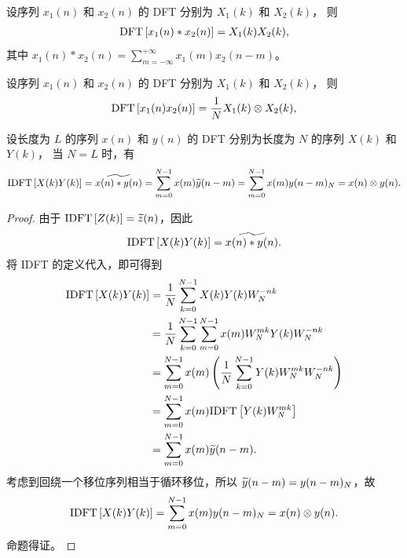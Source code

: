 \begin{property}
    设序列 $x_1(n)$ 和 $x_2(n)$ 的 DFT 分别为 $X_1(k)$ 和 $X_2(k)$，
    则
    \begin{align*}
        \mathrm{DFT}\left[x_1(n) * x_2(n)\right] = X_1(k)X_2(k),
    \end{align*}
    其中 $x_1(n) * x_2(n) = \sum_{m = -\infty}^{+\infty}x_1(m)x_2(n - m)$。
\end{property}

\begin{property}
    设序列 $x_1(n)$ 和 $x_2(n)$ 的 DFT 分别为 $X_1(k)$ 和 $X_2(k)$，
    则
    \begin{align*}
        \mathrm{DFT}\left[x_1(n)x_2(n)\right] = \frac{1}{N}X_1(k) \otimes X_2(k),
    \end{align*}
\end{property}

\begin{property}
    设长度为 $L$ 的序列 $x(n)$ 和 $y(n)$ 的 DFT 分别为长度为 $N$ 的序列 $X(k)$ 和 $Y(k)$，
    当 $N = L$ 时，有
    \begin{align*}
        \mathrm{IDFT}\left[X(k)Y(k)\right] = \widetilde{x(n) * y(n)}
        = \sum_{m = 0}^{N - 1}x(m)\widetilde{y}(n - m)
        = \sum_{m = 0}^{N - 1}x(m)y(n - m)_N = x(n) \otimes y(n).
    \end{align*}
\end{property}

\begin{proof}
    由于 $\mathrm{IDFT}\left[Z(k)\right] = \widetilde{z}(n)$，因此
    \begin{align*}
        \mathrm{IDFT}\left[X(k)Y(k)\right] = \widetilde{x(n) * y(n)}.
    \end{align*}
    将 IDFT 的定义代入，即可得到
    \begin{align*}
        \mathrm{IDFT}\left[X(k)Y(k)\right] & = \frac{1}{N}\sum_{k = 0}^{N - 1}X(k)Y(k)W_N^{-nk} \\
        & = \frac{1}{N}\sum_{k = 0}^{N - 1}\sum_{m = 0}^{N - 1}x(m)W_N^{mk}Y(k)W_N^{-nk} \\
        & = \sum_{m = 0}^{N - 1}x(m)\left(\frac{1}{N}\sum_{k = 0}^{N - 1}Y(k)W_N^{mk}W_N^{-nk}\right) \\
        & = \sum_{m = 0}^{N - 1}x(m)\mathrm{IDFT}\left[Y(k)W_N^{mk}\right] \\
        & = \sum_{m = 0}^{N - 1}x(m)\widetilde{y}(n - m).
    \end{align*}
    考虑到回绕一个移位序列相当于循环移位，所以 $\widetilde{y}(n - m) = y(n - m)_N$，故
    \begin{align*}
        \mathrm{IDFT}\left[X(k)Y(k)\right] = \sum_{m = 0}^{N - 1}x(m)y(n - m)_N = x(n) \otimes y(n).
    \end{align*}
    命题得证。
\end{proof}

